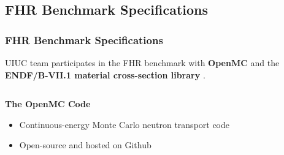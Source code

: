 \subsection{FHR Benchmark Specifications}
\begin{frame}
    \frametitle{FHR Benchmark Specifications}
    UIUC team participates in the FHR benchmark with \textbf{OpenMC} \cite{romano_openmc:_2015} 
    and the \textbf{ENDF/B-VII.1 material cross-section library} \cite{chadwick_endf/b-vii.1_2011}. 

\begin{columns}[t]
    \begin{column}{0.5\textwidth}

        \vspace{0.3cm}
        \textbf{The OpenMC Code} 
        \begin{itemize}
            \item Continuous-energy Monte Carlo neutron transport code 
            \item Open-source and hosted on Github 
        \end{itemize}
    

\end{column}
\end{columns}
\end{frame}
